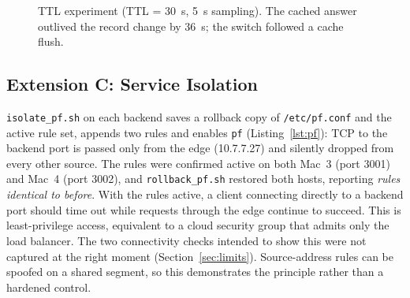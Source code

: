 \documentclass[conference,a4paper]{IEEEtran}
\newcommand{\code}[1]{\texttt{#1}}
\begin{document}
\begin{figure}[t]
\centering
{}
\caption{TTL experiment (TTL = 30~s, 5~s sampling). The cached answer outlived the record change
by 36~s; the switch followed a cache flush.}
\label{fig:ttl}
\end{figure}

\subsection{Extension C: Service Isolation}
\code{isolate\_pf.sh} on each backend saves a rollback copy of \code{/etc/pf.conf} and the active
rule set, appends two rules and enables \code{pf} (Listing~\ref{lst:pf}): TCP to the backend port
is passed only from the edge (10.7.7.27) and silently dropped from every other source. The rules
were confirmed active on both Mac~3 (port 3001) and Mac~4 (port 3002), and
\code{rollback\_pf.sh} restored both hosts, reporting \emph{rules identical to before}. With the
rules active, a client connecting directly to a backend port should time out while requests
through the edge continue to succeed. This is least-privilege access, equivalent to a cloud
security group that admits only the load balancer. The two connectivity checks intended to show
this were not captured at the right moment (Section~\ref{sec:limits}). Source-address rules can be
spoofed on a shared segment, so this demonstrates the principle rather than a hardened control.
\end{document}
